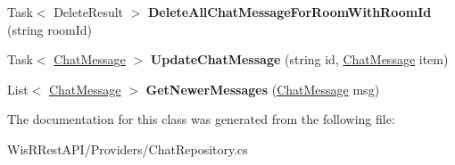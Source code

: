 \begin{DoxyCompactItemize}
\item 
\hypertarget{class_wis_r_rest_a_p_i_1_1_providers_1_1_chat_repository_a534d4ff614110ba607ae3cbab1915dda}{}Task$<$ Delete\+Result $>$ {\bfseries Delete\+All\+Chat\+Message\+For\+Room\+With\+Room\+Id} (string room\+Id)\label{class_wis_r_rest_a_p_i_1_1_providers_1_1_chat_repository_a534d4ff614110ba607ae3cbab1915dda}

\item 
\hypertarget{class_wis_r_rest_a_p_i_1_1_providers_1_1_chat_repository_a173831b24bb01eb5fc58c98aff2c14d7}{}Task$<$ \hyperlink{class_wis_r_1_1_domain_model_1_1_chat_message}{Chat\+Message} $>$ {\bfseries Update\+Chat\+Message} (string id, \hyperlink{class_wis_r_1_1_domain_model_1_1_chat_message}{Chat\+Message} item)\label{class_wis_r_rest_a_p_i_1_1_providers_1_1_chat_repository_a173831b24bb01eb5fc58c98aff2c14d7}

\item 
\hypertarget{class_wis_r_rest_a_p_i_1_1_providers_1_1_chat_repository_adc4acbe422f976fdf85c1db1033e6bf2}{}List$<$ \hyperlink{class_wis_r_1_1_domain_model_1_1_chat_message}{Chat\+Message} $>$ {\bfseries Get\+Newer\+Messages} (\hyperlink{class_wis_r_1_1_domain_model_1_1_chat_message}{Chat\+Message} msg)\label{class_wis_r_rest_a_p_i_1_1_providers_1_1_chat_repository_adc4acbe422f976fdf85c1db1033e6bf2}

\end{DoxyCompactItemize}


The documentation for this class was generated from the following file\+:\begin{DoxyCompactItemize}
\item 
Wis\+R\+Rest\+A\+P\+I/\+Providers/Chat\+Repository.\+cs\end{DoxyCompactItemize}
